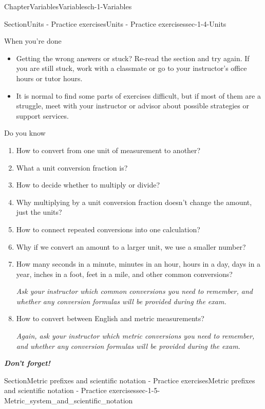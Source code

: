 \documentclass[twoside,11pt,]{book}
\newcommand{\alert}[1]{\textbf{\textit{#1}}}
\numberwithin{equation}{section}
\begin{document}
\begin{chapterptx}{Chapter}{Variables}{}{Variables}{}{}{ch-1-Variables}
\begin{sectionptx}{Section}{Units - Practice exercises}{}{Units - Practice exercises}{}{}{sec-1-4-Units}
\begin{conclusion}{When you're done \textellipsis{}}
\begin{itemize}[label=\textbullet]
\item{}Getting the wrong answers or stuck? Re-read the section and try again. If you are still stuck, work with a classmate or go to your instructor's office hours or tutor hours.%
\item{}It is normal to find some parts of exercises difficult, but if most of them are a struggle, meet with your instructor or advisor about possible strategies or support services.%
\end{itemize}
%
\end{conclusion}%
\begin{conclusion}{Do you know \textellipsis{}}%
%
\begin{enumerate}[label={\Alph*.}]
\item{}How to convert from one unit of measurement to another?%
\item{}What a unit conversion fraction is?%
\item{}How to decide whether to multiply or divide?%
\item{}Why multiplying by a unit conversion fraction doesn't change the amount, just the units?%
\item{}How to connect repeated conversions into one calculation?%
\item{}Why if we convert an amount to a larger unit, we use a smaller number?%
\item{}How many seconds in a minute, minutes in an hour, hours in a day, days in a year, inches in a foot, feet in a mile, and other common conversions?%
\par
\emph{Ask your instructor which common conversions you need to remember, and whether any conversion formulas will be provided during the exam.}%
\item{}How to convert between English and metric measurements?%
\par
\emph{Again, ask your instructor which metric conversions you need to remember, and whether any conversion formulas will be provided during the exam.}%
\end{enumerate}
%
\par
\alert{Don't forget!}%
\end{conclusion}%
\end{sectionptx}
%
%
\typeout{************************************************}
\typeout{************************************************}
%
\begin{sectionptx}{Section}{Metric prefixes and scientific notation - Practice exercises}{}{Metric prefixes and scientific notation - Practice exercises}{}{}{sec-1-5-Metric_system_and_scientific_notation}

\end{sectionptx}
\end{chapterptx}
\end{document}
